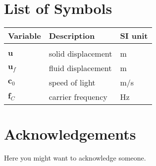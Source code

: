\documentclass{Configuration_Files/PoliMi3i_thesis}
\begin{document}

% 


\cleardoublepage
{} %




\listoffigures

\listoftables

\chapter*{List of Symbols} %
\begin{table}[H]
    \centering
    \begin{tabular}{lll}
        \textbf{Variable} & \textbf{Description} & \textbf{SI unit} \\\hline\\[-9px]
        $\bm{u}$ & solid displacement & m \\[2px]
        $\bm{u}_f$ & fluid displacement & m \\[2px]
        $\bm{c}_0$ & speed of light & m/s \\[2px]
        $\bm{f}_C$ & carrier frequency & Hz \\[2px]
    \end{tabular}
\end{table}

\chapter*{Acknowledgements}
Here you might want to acknowledge someone.

\cleardoublepage
\end{document}
